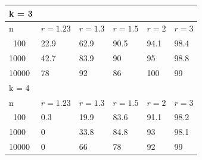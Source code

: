\documentclass{article}
\begin{document}
\begin{center}
\begin{tabular}{l | l | l | l | l | l} \hline \hline k = 3 \\ \hline
    \hline n & $r = 1.23$ &  $r = 1.3$  &  $r = 1.5$ & $r = 2$ & $r = 3$\\ \hline
    \hline \ 100 & 22.9 & 62.9 & 90.5 & 94.1 & 98.4 \\ \hline 
    1000 & 42.7 & 83.9 & 90 & 95 & 98.8 \\ \hline
    10000 & 78 & 92 & 86 & 100 & 99 \\ \hline
    \hline
    k = 4 \\
    \hline
    \hline n & $r = 1.23$ &  $r = 1.3$  &  $r = 1.5$ & $r = 2$ & $r = 3$\\ \hline
    \hline \ 100 & 0.3 & 19.9 & 83.6 & 91.1 & 98.2 \\ \hline 
    1000 & 0 & 33.8 & 84.8 & 93 & 98.1 \\ \hline
    10000 & 0 & 66 & 78 & 92 & 99 \\ \hline
\end{tabular}
\end{center}
\end{document}
